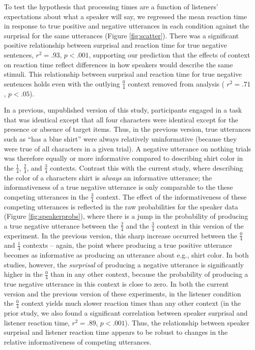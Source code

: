 \documentclass[man, noapacite]{apa2}
\begin{document}
To test the hypothesis that processing times are a function of listeners' expectations about what a speaker will say, we regressed the mean reaction time in response to true positive and negative utterances in each condition against the surprisal for the same utterances (Figure \ref{fig:scatter}).  There was a significant positive relationship between surprisal and reaction time for true negative sentences, $r^2=.93$, $p<.001$, supporting our prediction that the effects of context on reaction time reflect differences in how speakers would describe the same stimuli. This relationship between surprisal and reaction time for true negative sentences holds even with the outlying $\frac{0}{4}$ context removed from analysis ( $r^2=.71$, $p<.05$).

In a previous, unpublished version of this study, participants engaged in a task that was identical except that all four characters were identical except for the presence or absence of target items. Thus, in the previous version, true utterances such as ``has a blue shirt'' were always relatively uninformative (because they were true of all characters in a given trial). A negative utterance on nothing trials was therefore equally or more informative compared to describing shirt color in the $\frac{1}{4}$, $\frac{2}{4}$, and $\frac{3}{4}$ contexts. Contrast this with the current study, where describing the color of a characters shirt is \emph{always} an informative utterance; the informativeness of a true negative utterance is only comparable to the these competing utterances in the $\frac{3}{4}$ context. The effect of the informativeness of these competing utterances is reflected in the raw probabilities for the speaker data (Figure \ref{fig:speakerprobs}), where there is a jump in the probability of producing a true negative utterance between the $\frac{2}{4}$ and the $\frac{3}{4}$ context in this version of the experiment. In the previous version, this sharp increase occurred between the $\frac{0}{4}$ and $\frac{1}{4}$ contexts -- again, the point where producing a true positive utterance becomes as informative as producing an utterance about e.g., shirt color. In both studies, however, the \emph{surprisal} of producing a negative utterance is significantly higher in the $\frac{0}{4}$ than in any other context, because the probability of producing a true negative utterance in this context is close to zero. In both the current version and the previous version of these experiments, in the listener condition the $\frac{0}{4}$ context yields much slower reaction times than any other context (in the prior study, we also found a significant correlation between speaker surprisal and listener reaction time, $r^2=.89$, $p<.001$). Thus, the relationship between speaker surprisal and listener reaction time appears to be robust to changes in the relative informativeness of competing utterances. 
\end{document}
